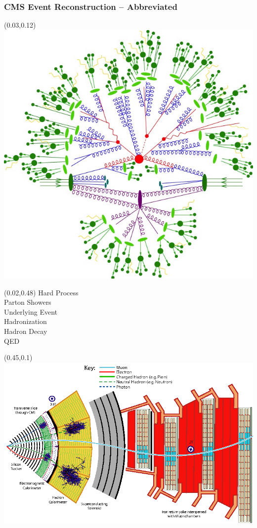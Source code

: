 \begin{frame}[t]\frametitle{CMS Event Reconstruction -- Abbreviated}    
	\begin{textblock}{0.4}(0.03,0.12)
		\includegraphics[width=\textwidth]{images/pileup_mitigation/sherpa_sim_0.jpeg}
	\end{textblock}
	\begin{textblock}{0.3}(0.02,0.48)
		\tiny
		{\color{red}Hard Process}\\
		{\color{blue}Parton Showers}\\
		{\color{violet}Underlying Event}\\
		{\color{green}Hadronization}\\
		{\color{ForestGreen}Hadron Decay}\\
		{\color{CUGold}QED}
	\end{textblock}   
	\begin{textblock}{0.55}(0.45,0.1)
		\includegraphics[width=\textwidth]{images/pileup_mitigation/cms-transverse-slice-crop.png}

\end{textblock}
\end{frame}
